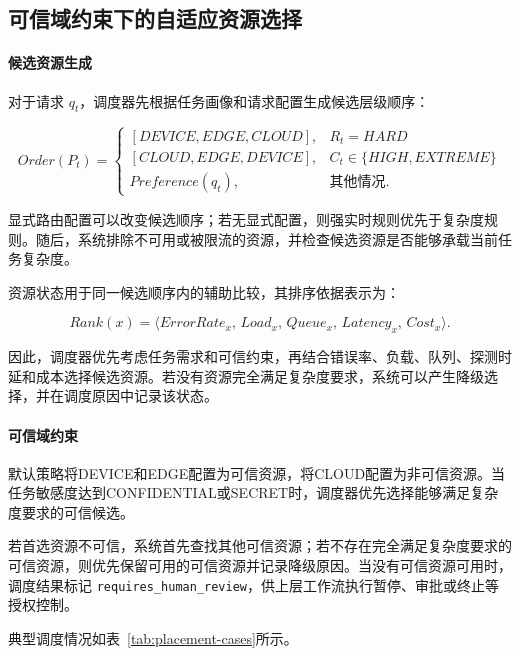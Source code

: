 \subsection{可信域约束下的自适应资源选择}

\paragraph{候选资源生成}

对于请求 \(q_t\)，调度器先根据任务画像和请求配置生成候选层级顺序：

\[
Order(P_t)=
\begin{cases}
[DEVICE,EDGE,CLOUD],& R_t=HARD\\
[CLOUD,EDGE,DEVICE],& C_t\in\{HIGH,EXTREME\}\\
Preference(q_t),& \text{其他情况}.
\end{cases}
\]


显式路由配置可以改变候选顺序；若无显式配置，则强实时规则优先于复杂度规则。随后，系统排除不可用或被限流的资源，并检查候选资源是否能够承载当前任务复杂度。

资源状态用于同一候选顺序内的辅助比较，其排序依据表示为：

\[
Rank(x)=
\langle
ErrorRate_x,\,
Load_x,\,
Queue_x,\,
Latency_x,\,
Cost_x
\rangle .
\]

因此，调度器优先考虑任务需求和可信约束，再结合错误率、负载、队列、探测时延和成本选择候选资源。若没有资源完全满足复杂度要求，系统可以产生降级选择，并在调度原因中记录该状态。

\paragraph{可信域约束}

默认策略将DEVICE和EDGE配置为可信资源，将CLOUD配置为非可信资源。当任务敏感度达到CONFIDENTIAL或SECRET时，调度器优先选择能够满足复杂度要求的可信候选。

若首选资源不可信，系统首先查找其他可信资源；若不存在完全满足复杂度要求的可信资源，则优先保留可用的可信资源并记录降级原因。当没有可信资源可用时，调度结果标记
\texttt{requires\_human\_review}，供上层工作流执行暂停、审批或终止等授权控制。

典型调度情况如表~\ref{tab:placement-cases}所示。

